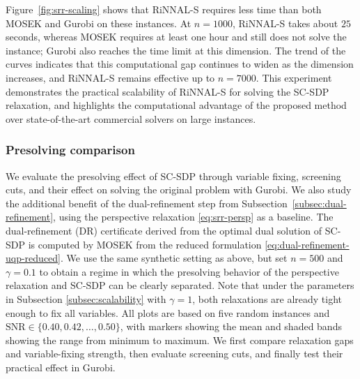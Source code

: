 \documentclass[11pt]{article}
\theoremstyle{plain}
\begin{document}
Figure~\ref{fig:srr-scaling} shows that RiNNAL-S requires less time than both MOSEK and Gurobi on these instances. At $n=1000$, RiNNAL-S takes about $25$ seconds, whereas MOSEK requires at least one hour and still does not solve the instance; Gurobi also reaches the time limit at this dimension. The trend of the curves indicates that this computational gap continues to widen as the dimension increases, and RiNNAL-S remains effective up to $n=7000$. This experiment demonstrates the practical scalability of RiNNAL-S for solving the SC-SDP relaxation, and highlights the computational advantage of the proposed method over state-of-the-art commercial solvers on large instances.



\subsubsection{Presolving comparison}\label{subsubsec:srr-presolving-comparison}

We evaluate the presolving effect of SC-SDP through variable fixing, screening cuts, and their effect on solving the original problem with Gurobi. We also study the additional benefit of the dual-refinement step from Subsection~\ref{subsec:dual-refinement}, using the perspective relaxation \eqref{eq:srr-persp} as a baseline. The dual-refinement (DR) certificate derived from the optimal dual solution of SC-SDP is computed by MOSEK from the reduced formulation \eqref{eq:dual-refinement-uqp-reduced}. We use the same synthetic setting as above, but set $n=500$ and $\gamma=0.1$ to obtain a regime in which the presolving behavior of the perspective relaxation and SC-SDP can be clearly separated.
Note that under the parameters in Subsection \ref{subsec:scalability}
with $\gamma = 1$, both relaxations are already tight enough to fix all variables. 
All plots are based on five random instances and $\mathrm{SNR}\in\{0.40,0.42,\ldots,0.50\}$, with markers showing the mean and shaded bands showing the range from minimum to maximum. We first compare relaxation gaps and variable-fixing strength, then evaluate screening cuts, and finally test their practical effect in Gurobi.
\end{document}
